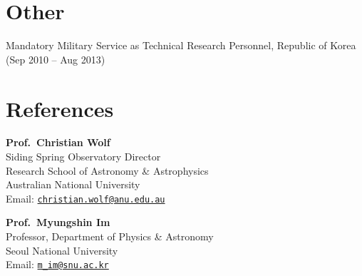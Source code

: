 \documentclass[letterpaper,11pt]{article}
\renewenvironment{itemize}{
  \begin{list}{}{
    \setlength{\leftmargin}{1.5em}
    \setlength{\itemsep}{0.2em}
    \setlength{\parsep}{0em}
  }
}{
  \end{list}
}
\begin{document}

\section*{Other}
\begin{itemize}
\item Mandatory Military Service as Technical Research Personnel, Republic of Korea
      (Sep 2010 -- Aug 2013)
\end{itemize}

\section*{References}

\begin{minipage}[t]{0.48\linewidth}
\textbf{Prof.\ Christian Wolf} \\
Siding Spring Observatory Director \\
Research School of Astronomy \& Astrophysics \\
Australian National University \\
Email: \href{mailto:christian.wolf@anu.edu.au}{\tt christian.wolf@anu.edu.au}
\end{minipage}
\hfill
\begin{minipage}[t]{0.48\linewidth}
\textbf{Prof.\ Myungshin Im} \\
Professor, Department of Physics \& Astronomy \\
Seoul National University \\
Email: \href{mailto:m_im@snu.ac.kr}{\tt m\_im@snu.ac.kr}
\end{minipage}
\end{document}
